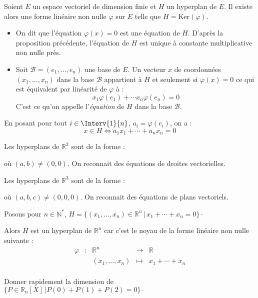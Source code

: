 \documentclass[a4paper,10pt]{report}
\begin{document}
\newpage

$\phantom{test}$

\vspace{3cm}

\begin{defip} Soient $E$ un espace vectoriel de dimension finie et $H$ un hyperplan de $E$. Il existe alors une forme linéaire non nulle $\varphi$ sur $E$ telle que $H = \textrm{Ker}(\varphi)$. 

\begin{itemize}
\item On dit que l'équation $\varphi(x)=0$ est une équation de $H$. D'après la proposition précédente, l'équation de $H$ est unique à constante multiplicative non nulle près.
\item Soit $\mathcal{B}=(e_1, \ldots, e_n)$ une base de $E$. Un vecteur $x$ de coordonnées $(x_1, \ldots, x_n)$ dans la base $\mathcal{B}$ appartient à $H$ et seulement si $\varphi(x)=0$ ce qui est équivalent par linéarité de $\varphi$ à :
$$x_1 \varphi(e_1) + \cdots x_n \varphi(e_n) = 0$$
C'est ce qu'on appelle l'\textit{équation} de $H$ dans la base $\mathcal{B}$.
\end{itemize}
\end{defip}

\begin{rem} En posant pour tout $i \in \Interv{1}{n}$, $a_i = \varphi(e_i)$, on a :
$$ x \in H \Longleftrightarrow a_1 x_1 + \cdots + a_n x_n = 0$$
\end{rem}

\begin{exems}
\item Les hyperplans de $\mathbb{R}^2$ sont de la forme :

\vspace{1cm}

où $(a,b) \neq (0,0)$. On reconnait des équations de droites vectorielles.
\item  Les hyperplans de $\mathbb{R}^3$ sont de la forme :

\vspace{1cm
}
où $(a,b,c) \neq (0,0,0)$. On reconnait des équations de plans vectoriels.
\item Posons pour $n \in \mathbb{N}^*$, $H = \lbrace (x_1, \ldots, x_n) \in \mathbb{R}^n \, \vert \, x_1 + \cdots + x_n = 0 \rbrace \cdot$

\noindent Alors $H$ est un hyperplan de $\mathbb{R}^n$ car c'est le noyau de la forme linéaire non nulle suivante :
$$ \begin{array}{ccccl}
\varphi & : & \mathbb{R}^n  & \rightarrow & \mathbb{R} \\
& & (x_1, \ldots, x_n) & \mapsto &  x_1 + \cdots + x_n \\
\end{array}$$
\end{exems}

\begin{exa} Donner rapidement la dimension de $\lbrace P \in \mathbb{R}_n[X] \, \vert P(0)+P(1)+P(2)= 0 \rbrace\cdot$ \end{exa}
\end{document}
